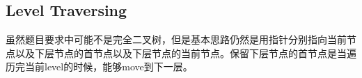 \subsection{Level Traversing}
虽然题目要求中可能不是完全二叉树，但是基本思路仍然是用指针分别指向当前节点以及下层节点的首节点以及下层节点的当前节点。保留下层节点的首节点是当遍历完当前level的时候，能够move到下一层。
